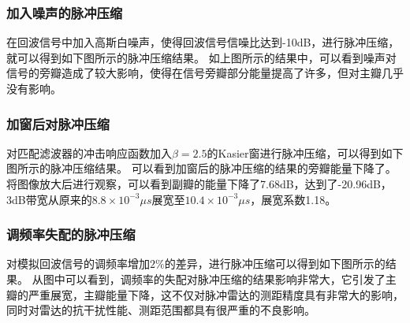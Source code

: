 \subsubsection{加入噪声的脉冲压缩}
在回波信号中加入高斯白噪声，使得回波信号信噪比达到-10dB，进行脉冲压缩，就可以得到如下图所示的脉冲压缩结果。
如上图所示的结果中，可以看到噪声对信号的旁瓣造成了较大影响，使得在信号旁瓣部分能量提高了许多，但对主瓣几乎没有影响。
\subsubsection{加窗后对脉冲压缩}
对匹配滤波器的冲击响应函数加入$\beta=2.5$的Kasier窗进行脉冲压缩，可以得到如下图所示的脉冲压缩结果。
可以看到加窗后的脉冲压缩的结果的旁瓣能量下降了。将图像放大后进行观察，可以看到副瓣的能量下降了7.68dB，达到了-20.96dB，3dB带宽从原来的$8.8\times 10^{-3}\mu s$展宽至$10.4\times 10^{-3}\mu s$，展宽系数1.18。
\subsubsection{调频率失配的脉冲压缩}
对模拟回波信号的调频率增加$2\%$的差异，进行脉冲压缩可以得到如下图所示的结果。
从图中可以看到，调频率的失配对脉冲压缩的结果影响非常大，它引发了主瓣的严重展宽，主瓣能量下降，这不仅对脉冲雷达的测距精度具有非常大的影响，同时对雷达的抗干扰性能、测距范围都具有很严重的不良影响。